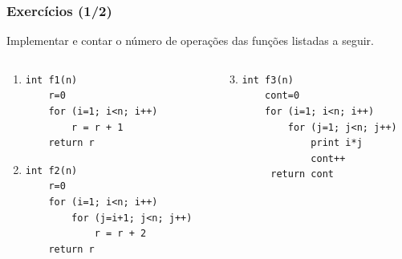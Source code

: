 \documentclass[aspectratio=169]{beamer}
\begin{document}
\begin{frame}[fragile]\frametitle{Exercícios (1/2)}
Implementar e contar o número de operações das funções listadas a seguir.
\begin{columns}[T]
\begin{column}{0.5\linewidth}
\begin{enumerate}
	\item
{\small
\begin{verbatim}
int f1(n)
    r=0
    for (i=1; i<n; i++)
        r = r + 1
    return r
\end{verbatim}
}
	\item
{\small
\begin{verbatim}
int f2(n)
    r=0
    for (i=1; i<n; i++)
        for (j=i+1; j<n; j++)
            r = r + 2
    return r
\end{verbatim}
}
\end{enumerate}
\end{column}
\begin{column}{0.5\linewidth}
\begin{enumerate}
\setcounter{enumi}{2}
	\item
{\small
\begin{verbatim}
int f3(n)
    cont=0
    for (i=1; i<n; i++)
        for (j=1; j<n; j++)
            print i*j
            cont++
     return cont
\end{verbatim}
}
\end{enumerate}
\end{column}
\end{columns}
\end{frame}
\end{document}
